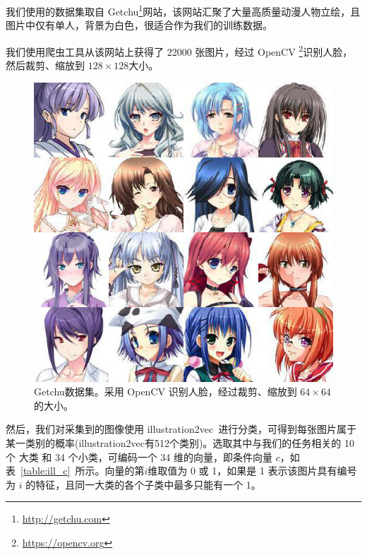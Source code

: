 \documentclass[a4paper,12pt,UTF8]{ctexart}
\newcommand{\kai}{\CJKfamily{zhkai}}	%
\begin{document}
我们使用的数据集取自 Getchu\footnote{\url{http://getchu.com}}网站，该网站汇聚了大量高质量动漫人物立绘，且图片中仅有单人，背景为白色，很适合作为我们的训练数据。

我们使用爬虫工具从该网站上获得了 22000 张图片，经过 OpenCV \footnote{\url{https://opencv.org}}识别人脸，然后裁剪、缩放到 $128\times128$大小。

\begin{figure}[H]
  \centering
  \includegraphics[width=0.5\linewidth]{figs/ex6.png}
  \caption{\kai Getchu数据集。采用 OpenCV 识别人脸，经过裁剪、缩放到 $64\times64$ 的大小。}
  \label{fig:getchu_disp}
\end{figure}

然后，我们对采集到的图像使用 illustration2vec~\cite{Saito2015Illustration2Vec}进行分类，可得到每张图片属于某一类别的概率(illustration2vec有512个类别)。选取其中与我们的任务相关的 10 个 大类 和 34 个小类，可编码一个 34 维的向量，即条件向量 $c$，如表~\ref{table:ill_c}~所示。向量的第$i$维取值为 0 或 1，如果是 1 表示该图片具有编号为 $i$ 的特征，且同一大类的各个子类中最多只能有一个 1。
\end{document}
